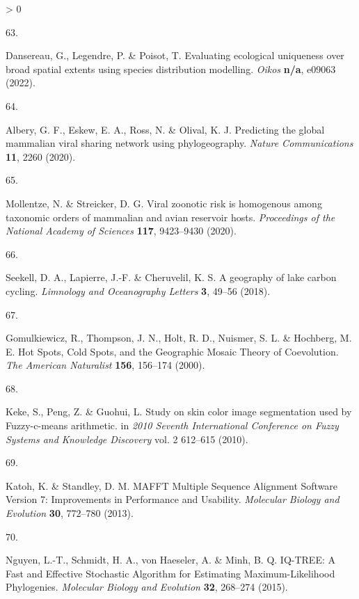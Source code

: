 \documentclass[10pt,oneside]{article}
\newlength{\cslhangindent}
\newlength{\csllabelwidth}
\newenvironment{CSLReferences}[3] %
 {%
  \setlength{\parindent}{0pt}
  \ifodd #1 \everypar{\setlength{\hangindent}{\cslhangindent}}\ignorespaces\fi
  \ifnum #2 > 0
  \setlength{\parskip}{#2\baselineskip}
  \fi
 }%
 {}
\newcommand{\CSLLeftMargin}[1]{\parbox[t]{\maxof{\widthof{#1}}{\csllabelwidth}}{#1}}
\newcommand{\CSLRightInline}[1]{\parbox[t]{\linewidth}{#1}}
\begin{document}
\begin{CSLReferences}{0}{0}
\leavevmode\hypertarget{ref-Dansereau2022Evaluating}{}%
\CSLLeftMargin{63. }
\CSLRightInline{Dansereau, G., Legendre, P. \& Poisot, T. Evaluating
ecological uniqueness over broad spatial extents using species
distribution modelling. \emph{Oikos} \textbf{n/a}, e09063 (2022).}

\leavevmode\hypertarget{ref-Albery2020Predicting}{}%
\CSLLeftMargin{64. }
\CSLRightInline{Albery, G. F., Eskew, E. A., Ross, N. \& Olival, K. J.
Predicting the global mammalian viral sharing network using
phylogeography. \emph{Nature Communications} \textbf{11}, 2260 (2020).}

\leavevmode\hypertarget{ref-Mollentze2020Viral}{}%
\CSLLeftMargin{65. }
\CSLRightInline{Mollentze, N. \& Streicker, D. G. Viral zoonotic risk is
homogenous among taxonomic orders of mammalian and avian reservoir
hosts. \emph{Proceedings of the National Academy of Sciences}
\textbf{117}, 9423--9430 (2020).}

\leavevmode\hypertarget{ref-Seekell2018Geography}{}%
\CSLLeftMargin{66. }
\CSLRightInline{Seekell, D. A., Lapierre, J.-F. \& Cheruvelil, K. S. A
geography of lake carbon cycling. \emph{Limnology and Oceanography
Letters} \textbf{3}, 49--56 (2018).}

\leavevmode\hypertarget{ref-Gomulkiewicz2000Hot}{}%
\CSLLeftMargin{67. }
\CSLRightInline{Gomulkiewicz, R., Thompson, J. N., Holt, R. D., Nuismer,
S. L. \& Hochberg, M. E. Hot Spots, Cold Spots, and the Geographic
Mosaic Theory of Coevolution. \emph{The American Naturalist}
\textbf{156}, 156--174 (2000).}

\leavevmode\hypertarget{ref-Keke2010Study}{}%
\CSLLeftMargin{68. }
\CSLRightInline{Keke, S., Peng, Z. \& Guohui, L. Study on skin color
image segmentation used by Fuzzy-c-means arithmetic. in \emph{2010
Seventh International Conference on Fuzzy Systems and Knowledge
Discovery} vol. 2 612--615 (2010).}

\leavevmode\hypertarget{ref-Katoh2013Mafft}{}%
\CSLLeftMargin{69. }
\CSLRightInline{Katoh, K. \& Standley, D. M. MAFFT Multiple Sequence
Alignment Software Version 7: Improvements in Performance and Usability.
\emph{Molecular Biology and Evolution} \textbf{30}, 772--780 (2013).}

\leavevmode\hypertarget{ref-Nguyen2015Iqtree}{}%
\CSLLeftMargin{70. }
\CSLRightInline{Nguyen, L.-T., Schmidt, H. A., von Haeseler, A. \& Minh,
B. Q. IQ-TREE: A Fast and Effective Stochastic Algorithm for Estimating
Maximum-Likelihood Phylogenies. \emph{Molecular Biology and Evolution}
\textbf{32}, 268--274 (2015).}


\end{CSLReferences}
\end{document}

